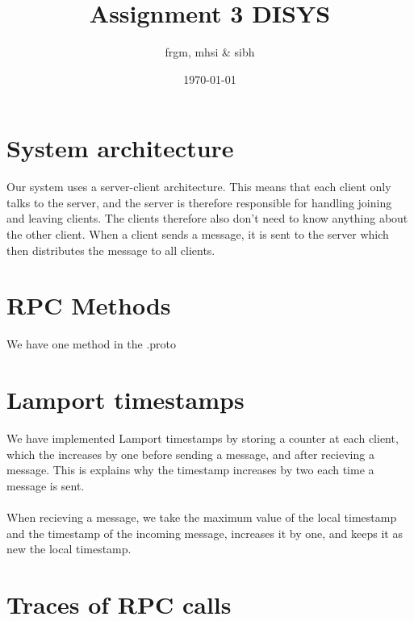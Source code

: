 \documentclass{article}
\title{Assignment 3 DISYS}
\author{frgm, mhsi & sibh}
\date{\today}
\begin{document}
\maketitle

\section*{System architecture}
Our system uses a server-client architecture.
This means that each client only talks to the server,
and the server is therefore responsible for handling joining and leaving clients.
The clients therefore also don't need to know anything about the other client.
When a client sends a message, it is sent to the server which then distributes the message to all clients.

\section*{RPC Methods}
We have one method in the .proto 

\section*{Lamport timestamps}
We have implemented Lamport timestamps by storing a counter at each client, which the increases by one before sending a message, and after recieving a message. This is explains why the timestamp increases by two each time a message is sent.
\\
\\ 
When recieving a message, we take the maximum value of the local timestamp and the timestamp of the incoming message, increases it by one, and keeps it as new the local timestamp.

\section*{Traces of RPC calls}
\end{document}
